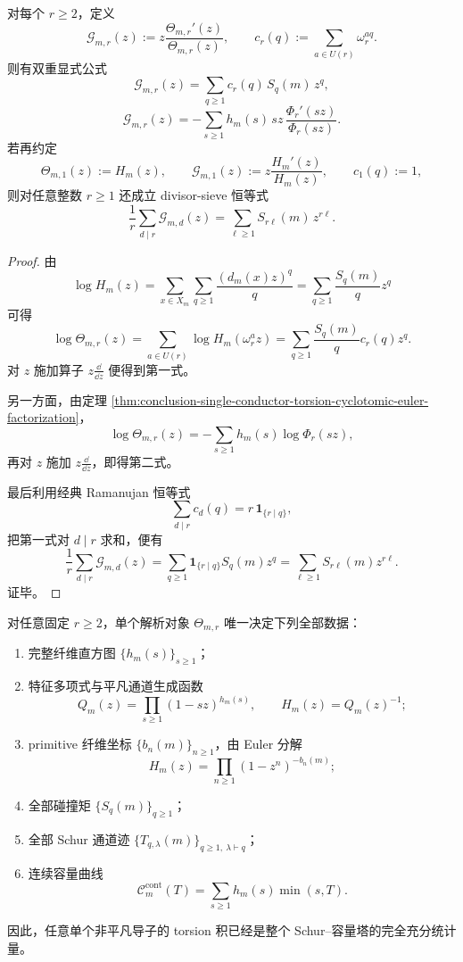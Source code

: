 \begin{theorem}\label{thm:conclusion-single-conductor-logderivative-ramanujan-moments}
对每个 \(r\ge 2\)，定义
\[
\mathcal G_{m,r}(z):=
z\frac{\Theta_{m,r}'(z)}{\Theta_{m,r}(z)},
\qquad
c_r(q):=\sum_{a\in U(r)}\omega_r^{aq}.
\]
则有双重显式公式
\[
\mathcal G_{m,r}(z)=\sum_{q\ge 1}c_r(q)\,S_q(m)\,z^q,
\]
\[
\mathcal G_{m,r}(z)
=
-\sum_{s\ge 1}h_m(s)\,s z\,\frac{\Phi_r'(sz)}{\Phi_r(sz)}.
\]
若再约定
\[
\Theta_{m,1}(z):=H_m(z),
\qquad
\mathcal G_{m,1}(z):=z\frac{H_m'(z)}{H_m(z)},
\qquad
c_1(q):=1,
\]
则对任意整数 \(r\ge 1\) 还成立 divisor-sieve 恒等式
\[
\frac1r\sum_{d\mid r}\mathcal G_{m,d}(z)
=
\sum_{\ell\ge 1}S_{r\ell}(m)\,z^{r\ell}.
\]
\end{theorem}

\begin{proof}
由
\[
\log H_m(z)=\sum_{x\in X_m}\sum_{q\ge 1}\frac{(d_m(x)z)^q}{q}
=
\sum_{q\ge 1}\frac{S_q(m)}{q}z^q
\]
可得
\[
\log \Theta_{m,r}(z)
=
\sum_{a\in U(r)}\log H_m(\omega_r^a z)
=
\sum_{q\ge 1}\frac{S_q(m)}{q}c_r(q)z^q.
\]
对 \(z\) 施加算子 \(z\frac{\dd}{\dd z}\) 便得到第一式。

另一方面，由定理 \ref{thm:conclusion-single-conductor-torsion-cyclotomic-euler-factorization}，
\[
\log\Theta_{m,r}(z)
=
-\sum_{s\ge 1}h_m(s)\log\Phi_r(sz),
\]
再对 \(z\) 施加 \(z\frac{\dd}{\dd z}\)，即得第二式。

最后利用经典 Ramanujan 恒等式
\[
\sum_{d\mid r}c_d(q)=r\,\mathbf 1_{\{r\mid q\}},
\]
把第一式对 \(d\mid r\) 求和，便有
\[
\frac1r\sum_{d\mid r}\mathcal G_{m,d}(z)
=
\sum_{q\ge 1}\mathbf 1_{\{r\mid q\}}S_q(m)z^q
=
\sum_{\ell\ge 1}S_{r\ell}(m)z^{r\ell}.
\]
证毕。
\end{proof}

\begin{theorem}\label{thm:conclusion-single-conductor-torsion-complete-sufficient-statistic}
对任意固定 \(r\ge 2\)，单个解析对象 \(\Theta_{m,r}\) 唯一决定下列全部数据：
\begin{enumerate}
  \item 完整纤维直方图 \(\{h_m(s)\}_{s\ge 1}\)；
  \item 特征多项式与平凡通道生成函数
  \[
  Q_m(z)=\prod_{s\ge 1}(1-sz)^{h_m(s)},
  \qquad
  H_m(z)=Q_m(z)^{-1};
  \]
  \item primitive 纤维坐标 \(\{b_n(m)\}_{n\ge 1}\)，由 Euler 分解
  \[
  H_m(z)=\prod_{n\ge 1}(1-z^n)^{-b_n(m)};
  \]
  \item 全部碰撞矩 \(\{S_q(m)\}_{q\ge 1}\)；
  \item 全部 Schur 通道迹 \(\{T_{q,\lambda}(m)\}_{q\ge 1,\ \lambda\vdash q}\)；
  \item 连续容量曲线
  \[
  \mathcal C_m^{\mathrm{cont}}(T)=\sum_{s\ge 1}h_m(s)\min(s,T).
  \]
\end{enumerate}
因此，任意单个非平凡导子的 torsion 积已经是整个 Schur--容量塔的完全充分统计量。
\end{theorem}

